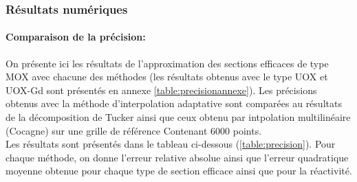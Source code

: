 \subsubsection{Résultats numériques}
\paragraph{Comparaison de la précision:\\}
\hspace{0.5cm}
On présente ici les résultats de l'approximation des sections efficaces de type MOX avec chacune des méthodes (les résultats obtenus avec le type UOX et UOX-Gd sont présentés en annexe \ref{table:precisionannexe}). Les précisions obtenus avec la méthode d'interpolation adaptative sont comparées au résultats de la décomposition de Tucker ainsi que ceux obtenu par intpolation multilinéaire (Cocagne) sur une grille de référence Contenant $6000$ points.\\
Les résultats sont présentés dans le tableau ci-dessous (\ref{table:precision}). Pour chaque méthode, on donne l'erreur relative absolue ainsi que l'erreur quadratique moyenne obtenue pour chaque type de section efficace ainsi que pour la réactivité.\\
